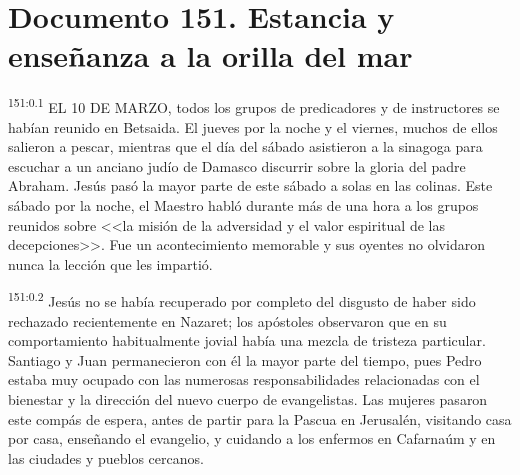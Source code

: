 \chapter{Documento 151. Estancia y enseñanza a la orilla del mar}
\par 
\textsuperscript{151:0.1} EL 10 DE MARZO, todos los grupos de predicadores y de instructores se habían reunido en Betsaida. El jueves por la noche y el viernes, muchos de ellos salieron a pescar, mientras que el día del sábado asistieron a la sinagoga para escuchar a un anciano judío de Damasco discurrir sobre la gloria del padre Abraham. Jesús pasó la mayor parte de este sábado a solas en las colinas. Este sábado por la noche, el Maestro habló durante más de una hora a los grupos reunidos sobre <<la misión de la adversidad y el valor espiritual de las decepciones>>. Fue un acontecimiento memorable y sus oyentes no olvidaron nunca la lección que les impartió.

\par 
\textsuperscript{151:0.2} Jesús no se había recuperado por completo del disgusto de haber sido rechazado recientemente en Nazaret; los apóstoles observaron que en su comportamiento habitualmente jovial había una mezcla de tristeza particular. Santiago y Juan permanecieron con él la mayor parte del tiempo, pues Pedro estaba muy ocupado con las numerosas responsabilidades relacionadas con el bienestar y la dirección del nuevo cuerpo de evangelistas. Las mujeres pasaron este compás de espera, antes de partir para la Pascua en Jerusalén, visitando casa por casa, enseñando el evangelio, y cuidando a los enfermos en Cafarnaúm y en las ciudades y pueblos cercanos.

